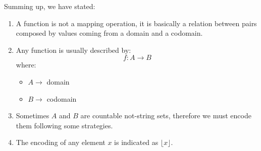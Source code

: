Summing up, we have stated:
\begin{enumerate}
    \item A function is not a mapping operation, it is basically a relation between pairs composed by values coming from a domain and a codomain.
    \item Any function is usually described by: $$f: A \rightarrow B$$ where:
    \begin{itemize}
        \renewcommand{\labelitemi}{-}
        \item $A \rightarrow$ domain
        \item $B \rightarrow$ codomain
    \end{itemize}
    \item Sometimes $A$ and $B$ are countable not-string sets, therefore we must encode them following some strategies.
    \item The encoding of any element $x$ is indicated as $\lfloor x \rfloor$.
\end{enumerate}

